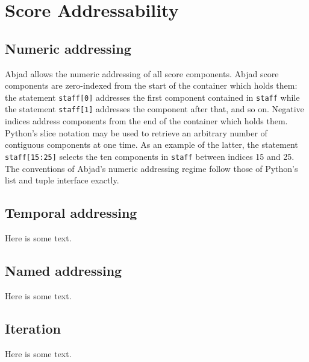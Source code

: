\section{Score Addressability}\label{sec:score_addressability}

\begin{comment}
Score Addressability [Trevor]
    - Iteration
        - methods that "get_*"
            Container.select_leaves
            Container.select_notes_and_chords
            IterationAgent.by_class, .by_logical_tie, .by_timeline, .by_vertical_moment, .depth_first
        - efficient and intuitive navigation of the score hierarchy does what mapping does in a functional program
            -containers partake of Python's sequence iterating interface (for loops work)
    - Structural Addressing
        - numeric addressing
        - temporal addressing
        - named addressing
\end{comment}

\subsection{Numeric addressing}

Abjad allows the numeric addressing of all score components. Abjad score components are zero-indexed from the start of the container which holds them: the statement \texttt{staff[0]} addresses the first component contained in \texttt{staff} while the statement \texttt{staff[1]} addresses the component after that, and so on. Negative indices address components from the end of the container which holds them. Python's slice notation may be used to retrieve an arbitrary number of contiguous components at one time. As an example of the latter, the statement \texttt{staff[15:25]} selects the ten components in \texttt{staff} between indices 15 and 25. The conventions of Abjad's numeric addressing regime follow those of Python's list and tuple interface exactly. 

\subsection{Temporal addressing}

Here is some text.

\subsection{Named addressing}

Here is some text.

\subsection{Iteration}

Here is some text.